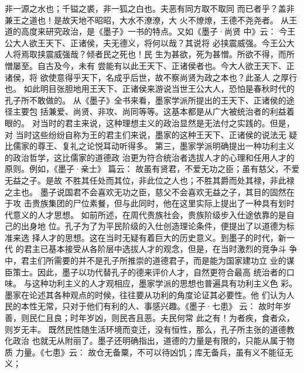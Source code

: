 \documentclass[12pt,UTF8]{ctexbook}
\begin{document}
非一源之水也；千镒之裘，非一狐之白也。夫恶有同方取不取同 
而已者乎？盖非兼王之道也！是故天地不昭昭，大水不潦潦，大 
火不燎燎，王德不尧尧者。 
从王道的高度来研究政治，是《墨子》一书的特点。又如《墨子·尚贤 
中》云： 
今王公大人欲王天下、正诸侯，夫无德义，将何以哉？其说将 
必挟震威强。今王公大人将焉取挟震威强哉？倾者民之死也！民 
生为甚欲，死为甚憎。所欲不得，而所憎屡至。自古及今，未有 
尝能有以此王天下、正诸侯者也。今大人欲王天下、正诸侯，将 
欲使意得乎天下，名成乎后世，故不察尚贤为政之本也？此圣人 
之厚行也。 
如此明目张胆地用王天下、正诸侯来游说当世王公大人，恐怕是春秋时代的 
孔子所不敢做的。 
从《墨子》全书来看，墨家学派所提出的王天下、正诸侯的途径主要包 
括兼爱、尚贤、非攻、尚同等等。这基本都是从广大被统治者的利益着眼的。 
对当时的君主来说，这种理想主义的政治显然是无法付之实践的。但是，对 
当时这些纷纷自称为王的君主们来说，墨家的这种王天下、正诸侯的说法无 
疑比儒家的尊王、复礼之论悦耳动听得多。 
第三，墨家学派明确提出一种功利主义的政治哲学，这比儒家的道德政 
治更为符合统治者选拔人才的心理和任用人才的原则。例如，《墨子·亲士》 
篇云： 
故虽有贤君，不爱无功之臣；虽有慈父，不爱无益之子。是故 
不胜其任处而其位，非此位之人也；不胜其爵而处其禄，非此禄 
之主也。 
墨子说国君不会喜欢无功之臣，慈父不会喜欢无益之子，其目的固然在于攻 
击贵族集团的尸位素餐，但与此同时，他在这里实际上提出了一种具有划时 
代意义的人才思想。 
如前所述，在周代贵族社会，贵族阶级步入仕途依靠的是自己的出身地 
位。孔子为了为平民阶级的入仕创造理论条件，便提出了以道德为标准来选 
择人才的思想。这在当时无疑有着巨大的历史意义。到墨子的时代，新一代 
的君主已基本接受从各阶层中选拔人才的观念，但是，在当时激烈的竞争斗 
争中，君主们所需要的并不是孔子所推崇的道德君子，而是能为国家建功立 
业的谋臣策士。因此，墨子以功代替孔子的德来评价人才，自然更符合最高 
统治者的口味。 
与这种功利主义的人才观相应，墨家学派的思想也普遍具有功利主义色 
彩。墨家在论述其各种观点的时候，往往要从功利的角度论证其必要性。他 
们认为人民的本性无常，只对于他们有利的人、事感兴趣。《墨子·七患》 
云： 
故时年岁善，则民仁且良；时年岁凶，则民吝且恶。夫民何常 
此之有！为者疾，食者众，则岁无丰。 
既然民性随生活环境而变迁，没有恒性，那么，孔子所主张的道德教化政治 
也就无从附丽了。墨子还明确指出，道德的力量是有限的，只能从属于物质 
力量。《七患》云： 
故仓无备粟，不可以待凶饥；库无备兵，虽有义不能征无义； 
\end{document}
